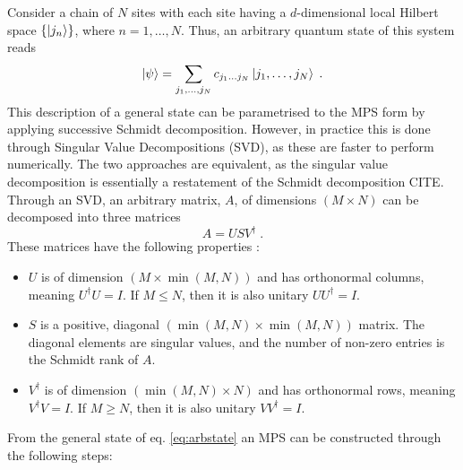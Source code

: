 Consider a chain of $N$ sites with each site having a $d$-dimensional local Hilbert space $\{ \ket{j_n} \}$, where $n = 1, \ldots, N$. Thus, an arbitrary quantum state of this system reads
\begin{equation}
	\ket{\psi} = \sum_{j_1, \ldots, j_N} c_{j_1 \ldots j_N} \ket{j_1, \ldots, j_N} \; .
	\label{eq:arbstate}
\end{equation}
This description of a general state can be parametrised to the MPS form by applying successive Schmidt decomposition. However, in practice this is done through Singular Value Decompositions (SVD), as these are faster to perform numerically. The two approaches are equivalent, as the singular value decomposition is essentially a restatement of the Schmidt decomposition CITE.
Through an SVD, an arbitrary matrix, $A$, of dimensions $(M \times N)$ can be decomposed into three matrices
\begin{equation}
	A = U S V^{\dag} \; .
\end{equation}
These matrices have the following properties \cite{schollwock}:
\begin{itemize}
\item
$U$ is of dimension $(M \times \min(M,N))$ and has orthonormal columns, meaning $U^{\dag}U = I$. If $M \leq N$, then it is also unitary $U U^{\dag} = I$.

\item
$S$ is a positive, diagonal $(\min(M,N) \times \min(M,N))$ matrix. The diagonal elements are singular values, and the number of non-zero entries is the Schmidt rank of $A$.

\item
$V^{\dag}$ is of dimension $(\min(M,N) \times N)$ and has orthonormal rows, meaning $V^{\dag}V = I$. If $M \geq N$, then it is also unitary $V V^{\dag} = I$.
\end{itemize} 
From the general state of eq. \eqref{eq:arbstate} an MPS can be constructed through the following steps:
